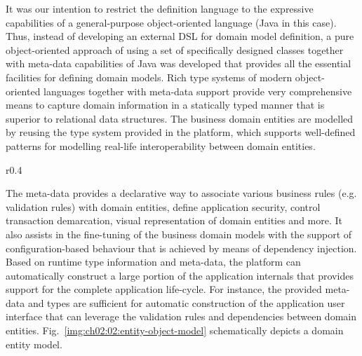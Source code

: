   It was our intention to restrict the definition language to the expressive capabilities of a general-purpose object-oriented language (Java in this case).
  Thus, instead of developing an external DSL for domain model definition, a pure object-oriented approach of using a set of specifically designed classes together with meta-data capabilities of Java was developed that provides all the essential facilities for defining domain models.
  Rich type systems of modern object-oriented languages together with meta-data support provide very comprehensive means to capture domain information in a statically typed manner that is superior to relational data structures.  
  The business domain entities are modelled by reusing the type system provided in the platform, which supports well-defined patterns for modelling real-life interoperability between domain entities.  

  \begin{wrapfigure}{r}{0.4\textwidth}
    \vspace{-20pt}
    \centering   
    \caption{Entity Object Model}\label{img:ch02:02:entity-object-model}
  \end{wrapfigure}  
  The meta-data provides a declarative way to associate various business rules (e.g. validation rules) with domain entities, define application security, control transaction demarcation, visual representation of domain entities and more.
  It also assists in the fine-tuning of the business domain models with the support of configuration-based behaviour that is achieved by means of dependency injection.  
  Based on runtime type information and meta-data, the platform can automatically construct a large portion of the application internals that provides support for the complete application life-cycle.
  For instance, the provided meta-data and types are sufficient for automatic construction of the application user interface that can leverage the validation rules and dependencies between domain entities.  
  Fig.~\ref{img:ch02:02:entity-object-model} schematically depicts a domain entity model.


